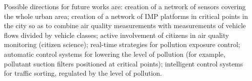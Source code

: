 \documentclass[journal]{IEEEtran}
\begin{document}
Possible directions for future works are: creation of a network of sensors covering the whole urban area;
creation of a network of IMP platforms in critical points in the city so as to combine air quality measurements with measurements of vehicle
flows divided by vehicle classes; active involvement of citizens in air quality  monitoring (citizen
science); real-time strategies for pollution exposure control;
automatic control systems for lowering the level of pollution (for example,
pollutant suction filters positioned at critical points);
intelligent control systems for traffic sorting, regulated by the level of
pollution.







%



%
\end{document}
